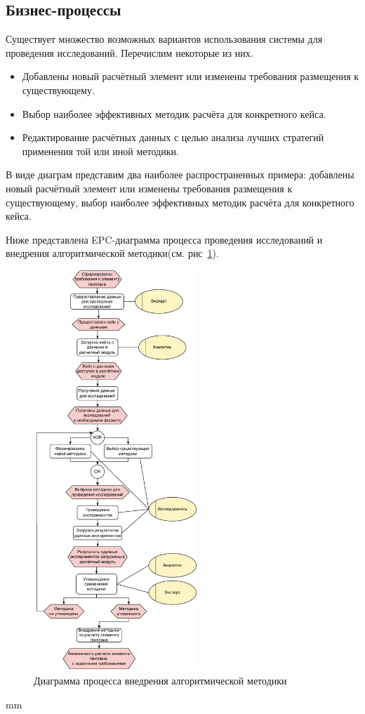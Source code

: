 \subsection{\Large{Бизнес-процессы}}

Существует множество возможных вариантов использования системы для проведения исследований.
Перечислим некоторые из них.
\begin{itemize}
	\item Добавлены новый расчётный элемент или изменены требования размещения к существующему.
	\item Выбор наиболее эффективных методик расчёта для конкретного кейса.
	\item Редактирование расчётных данных с целью анализа лучших стратегий применения той или иной методики.
\end{itemize}

В виде диаграм представим два наиболее распространенных примера: добавлены новый расчётный элемент
или изменены требования размещения к существующему, выбор наиболее эффективных методик расчёта для конкретного кейса.

Ниже представлена EPC-диаграмма процесса проведения исследований и
внедрения алгоритмической методики(см. рис\ \ref{pic:analysis__usecases-epc}).

\begin{figure}[H]
	\hspace*{-2.5 cm}\includegraphics[width=0.55\textwidth, left]{analysis/pictures/usecases/common_epc}
	\caption{Диаграмма процесса внедрения алгоритмической методики}
	\label{pic:analysis__usecases-epc}
\end{figure}
 mm

